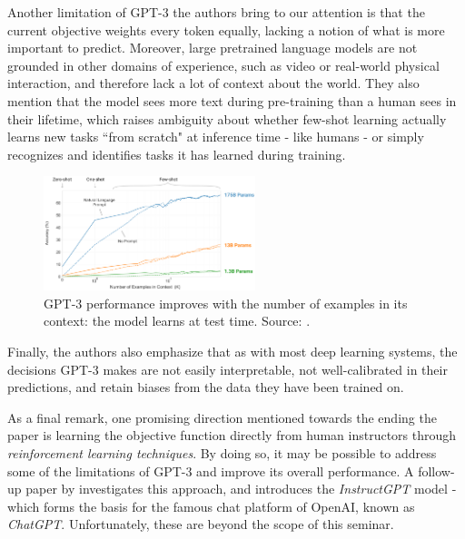 \documentclass{article}
\begin{document}
\medskip
\noindent
Another limitation of GPT-3 the authors bring to our attention is that the current objective weights every token equally, lacking a notion of what is more important to predict. Moreover, large pretrained language models are not grounded in other domains of experience, such as video or real-world physical interaction, and therefore lack a lot of context about the world. They also mention that the model sees more text during pre-training than a human sees in their lifetime, which raises ambiguity about whether few-shot learning actually learns new tasks ``from scratch" at inference time - like humans - or simply recognizes and identifies tasks it has learned during training.


\begin{figure}
    \centering
    \vspace{-2mm}
    \includegraphics[width=0.55\textwidth]{figures/gpt3_fig1_2.png}
    \caption{
        GPT-3 performance improves with the number of examples in its context: the model learns at test time. Source: \citet{brown2020gpt3}.
    }
    \label{fig:gpt3_fig1_2}
    \vspace{-2mm}
\end{figure}

\medskip
\noindent
Finally, the authors also emphasize that as with most deep learning systems, the decisions GPT-3 makes are not easily interpretable, not well-calibrated in their predictions, and retain biases from the data they have been trained on.

\medskip
\noindent
As a final remark, one promising direction mentioned towards the ending the paper is learning the objective function directly from human instructors through \emph{reinforcement learning techniques}. By doing so, it may be possible to address some of the limitations of GPT-3 and improve its overall performance. A follow-up paper by \citet{ouyang2022training} investigates this approach, and introduces the \emph{InstructGPT} model -  which forms the basis for the famous chat platform of OpenAI, known as \emph{ChatGPT}. Unfortunately, these are beyond the scope of this seminar.
\end{document}
